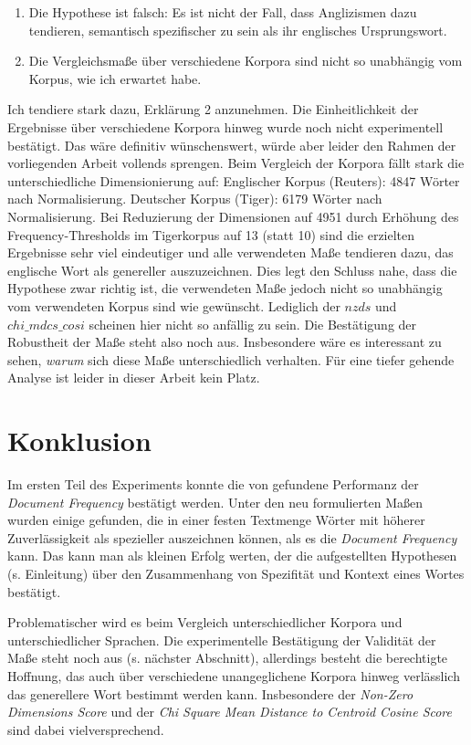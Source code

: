 \documentclass[11pt,numbers=noenddot]{scrartcl}
\begin{document}
\begin{enumerate}
    \item Die Hypothese ist falsch: Es ist nicht der Fall, dass Anglizismen dazu tendieren, semantisch spezifischer zu sein als ihr englisches Ursprungswort.
    \item Die Vergleichsmaße über verschiedene Korpora sind nicht so unabhängig vom Korpus, wie ich erwartet habe.
\end{enumerate}
Ich tendiere stark dazu, Erklärung 2 anzunehmen. Die Einheitlichkeit der Ergebnisse über verschiedene Korpora hinweg wurde noch nicht experimentell bestätigt. Das wäre definitiv wünschenswert, würde aber leider den Rahmen der vorliegenden Arbeit vollends sprengen. Beim Vergleich der Korpora fällt stark die unterschiedliche Dimensionierung auf: Englischer Korpus (Reuters): 4847 Wörter nach Normalisierung. Deutscher Korpus (Tiger): 6179 Wörter nach Normalisierung. Bei Reduzierung der Dimensionen auf 4951 durch Erhöhung des Frequency-Thresholds im Tigerkorpus auf 13 (statt 10) sind die erzielten Ergebnisse sehr viel eindeutiger und alle verwendeten Maße tendieren dazu, das englische Wort als genereller auszuzeichnen. Dies legt den Schluss nahe, dass die Hypothese zwar richtig ist, die verwendeten Maße jedoch nicht so unabhängig vom verwendeten Korpus sind wie gewünscht. Lediglich der $nzds$ und $chi\_mdcs\_cosi$ scheinen hier nicht so anfällig zu sein. Die Bestätigung der Robustheit der Maße steht also noch aus. Insbesondere wäre es interessant zu sehen, \emph{warum} sich diese Maße unterschiedlich verhalten. Für eine tiefer gehende Analyse ist leider in dieser Arbeit kein Platz.

\section{Konklusion}

Im ersten Teil des Experiments konnte die von \citet{Caraballo99determiningthe} gefundene Performanz der \emph{Document Frequency} bestätigt werden. Unter den neu formulierten Maßen wurden einige gefunden, die in einer festen Textmenge Wörter mit höherer Zuverlässigkeit als spezieller auszeichnen können, als es die \emph{Document Frequency} kann. Das kann man als kleinen Erfolg werten, der die aufgestellten Hypothesen (s. Einleitung) über den Zusammenhang von Spezifität und Kontext eines Wortes bestätigt.

Problematischer wird es beim Vergleich unterschiedlicher Korpora und unterschiedlicher Sprachen. Die experimentelle Bestätigung der Validität der Maße steht noch aus (s. nächster Abschnitt), allerdings besteht die berechtigte Hoffnung, das auch über verschiedene unangeglichene Korpora hinweg verlässlich das generellere Wort bestimmt werden kann. Insbesondere der \emph{Non-Zero Dimensions Score} und der \emph{Chi Square Mean Distance to Centroid Cosine Score} sind dabei vielversprechend.
\end{document}
